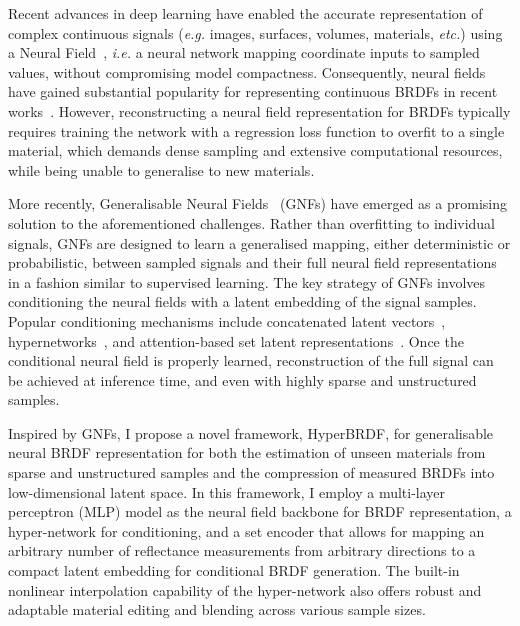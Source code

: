 Recent advances in deep learning have enabled the accurate representation of complex continuous signals (\textit{e.g.} images, surfaces, volumes, materials, \textit{etc.}) using a Neural Field~\cite{sitzmann2020siren, ffn, cnf2023}, \textit{i.e.} a neural network mapping coordinate inputs to sampled values, without compromising model compactness. Consequently, neural fields have gained substantial popularity for representing continuous \gls{BRDF}s in recent works~\cite{sztrajman2021neural, cnf2023}. However, reconstructing a neural field representation for \gls{BRDF}s typically requires training the network with a regression loss function to overfit to a single material, which demands dense sampling and extensive computational resources, while being unable to generalise to new materials.

More recently, Generalisable Neural Fields~\cite{rebain2022attention} (\gls{GNF}s) have emerged as a promising solution to the aforementioned challenges. Rather than overfitting to individual signals, \gls{GNF}s are designed to learn a generalised mapping, either deterministic or probabilistic, between sampled signals and their full neural field representations in a fashion similar to supervised learning. The key strategy of \gls{GNF}s involves conditioning the neural fields with a latent embedding of the signal samples. Popular conditioning mechanisms include concatenated latent vectors~\cite{park2019deepsdf}, hypernetworks~\cite{ha2017hypernetworks}, and attention-based set latent representations~\cite{jiang2021cotr}. Once the conditional neural field is properly learned, reconstruction of the full signal can be achieved at inference time, and even with highly sparse and unstructured samples.


Inspired by \gls{GNF}s, I propose a novel framework, HyperBRDF, for generalisable neural \gls{BRDF} representation for both the estimation of unseen materials from sparse and unstructured samples and the compression of measured \gls{BRDF}s into low-dimensional latent space. In this framework, I employ a multi-layer perceptron (\gls{MLP}) model as the neural field backbone for \gls{BRDF} representation, a hyper-network for conditioning, and a set encoder that allows for mapping an arbitrary number of reflectance measurements from arbitrary directions to a compact latent embedding for conditional \gls{BRDF} generation. 
The built-in nonlinear interpolation capability of the hyper-network also offers robust and adaptable material editing and blending across various sample sizes.


